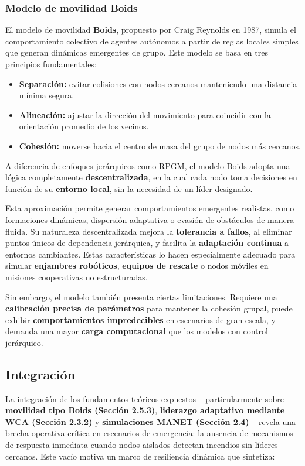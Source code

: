 \documentclass{article}
\begin{document}
\subsubsection{Modelo de movilidad Boids}

El modelo de movilidad \textbf{Boids}, propuesto por Craig Reynolds en 1987, simula el comportamiento colectivo de agentes autónomos a partir de reglas locales simples que generan dinámicas emergentes de grupo. Este modelo se basa en tres principios fundamentales:

\begin{itemize}
    \item \textbf{Separación:} evitar colisiones con nodos cercanos manteniendo una distancia mínima segura.
    \item \textbf{Alineación:} ajustar la dirección del movimiento para coincidir con la orientación promedio de los vecinos.
    \item \textbf{Cohesión:} moverse hacia el centro de masa del grupo de nodos más cercanos.
\end{itemize}

A diferencia de enfoques jerárquicos como RPGM, el modelo Boids adopta una lógica completamente \textbf{descentralizada}, en la cual cada nodo toma decisiones en función de su \textbf{entorno local}, sin la necesidad de un líder designado.

Esta aproximación permite generar comportamientos emergentes realistas, como formaciones dinámicas, dispersión adaptativa o evasión de obstáculos de manera fluida. Su naturaleza descentralizada mejora la \textbf{tolerancia a fallos}, al eliminar puntos únicos de dependencia jerárquica, y facilita la \textbf{adaptación continua} a entornos cambiantes. Estas características lo hacen especialmente adecuado para simular \textbf{enjambres robóticos}, \textbf{equipos de rescate} o nodos móviles en misiones cooperativas no estructuradas.

Sin embargo, el modelo también presenta ciertas limitaciones. Requiere una \textbf{calibración precisa de parámetros} para mantener la cohesión grupal, puede exhibir \textbf{comportamientos impredecibles} en escenarios de gran escala, y demanda una mayor \textbf{carga computacional} que los modelos con control jerárquico.


\subsection{Integración}
La integración de los fundamentos teóricos expuestos – particularmente sobre \textbf{movilidad tipo Boids (Sección 2.5.3)}, \textbf{liderazgo adaptativo mediante WCA (Sección 2.3.2)} y \textbf{simulaciones MANET (Sección 2.4)} – revela una brecha operativa crítica en escenarios de emergencia: la ausencia de mecanismos de respuesta inmediata cuando nodos aislados detectan incendios sin líderes cercanos. Este vacío motiva un marco de resiliencia dinámica que sintetiza:
\end{document}
